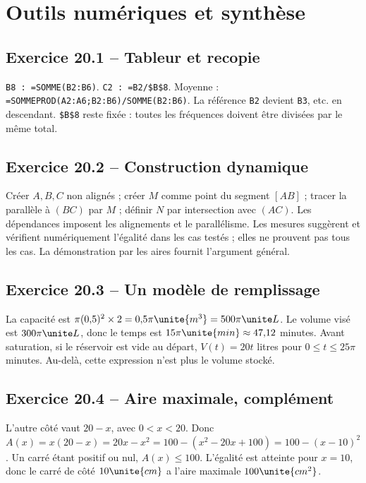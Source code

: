 \chapter{Outils numériques et synthèse}
\label{corriges:20}
\section*{Exercice 20.1 -- Tableur et recopie}
\texttt{B8 : =SOMME(B2:B6)}.
\texttt{C2 : =B2/\$B\$8}.
Moyenne : \texttt{=SOMMEPROD(A2:A6;B2:B6)/SOMME(B2:B6)}.
La référence \texttt{B2} devient \texttt{B3}, etc. en descendant. \texttt{\$B\$8} reste fixée : toutes les fréquences doivent être divisées par le même total.

\section*{Exercice 20.2 -- Construction dynamique}
Créer $A,B,C$ non alignés ; créer $M$ comme point du segment $[AB]$ ; tracer la parallèle à $(BC)$ par $M$ ; définir $N$ par intersection avec $(AC)$. Les dépendances imposent les alignements et le parallélisme. Les mesures suggèrent et vérifient numériquement l'égalité dans les cas testés ; elles ne prouvent pas tous les cas. La démonstration par les aires fournit l'argument général.

\section*{Exercice 20.3 -- Un modèle de remplissage}
La capacité est $\pi(0{,}5)^2\times2=0{,}5\pi\unite{m^3}=500\pi\unite L$. Le volume visé est $300\pi\unite L$, donc le temps est $15\pi\unite{min}\approx47{,}12$ minutes. Avant saturation, si le réservoir est vide au départ, $V(t)=20t$ litres pour $0\leq t\leq25\pi$ minutes. Au-delà, cette expression n'est plus le volume stocké.

\section*{Exercice 20.4 -- Aire maximale, complément}
L'autre côté vaut $20-x$, avec $0<x<20$. Donc $A(x)=x(20-x)=20x-x^2=100-(x^2-20x+100)=100-(x-10)^2$. Un carré étant positif ou nul, $A(x)\leq100$. L'égalité est atteinte pour $x=10$, donc le carré de côté $10\unite{cm}$ a l'aire maximale $100\unite{cm^2}$.
